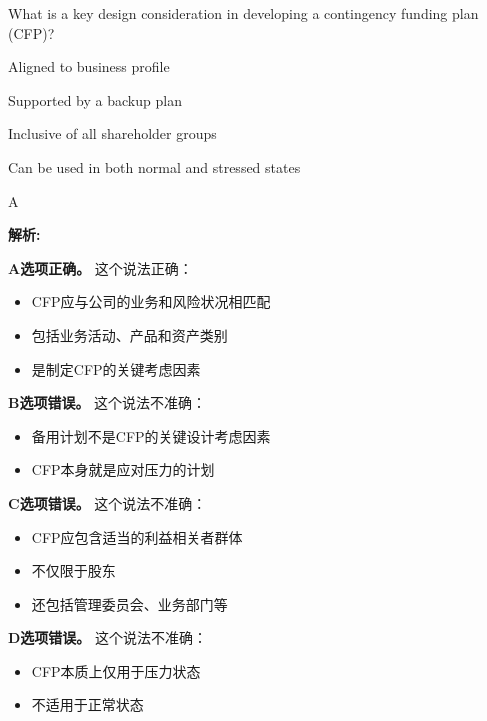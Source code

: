 \documentclass{article}
\newcounter{question} %
\newenvironment{explanation}
{\textbf{解析:}\par}
{\par}
\begin{document}
\begin{question}
    What is a key design consideration in developing a contingency funding plan (CFP)?
\end{question}

\begin{choices}
    \item Aligned to business profile
    \item Supported by a backup plan
    \item Inclusive of all shareholder groups
    \item Can be used in both normal and stressed states
\end{choices}

\begin{correctanswer}
    A
\end{correctanswer}

\begin{explanation}
    \textbf{A选项正确。}
    这个说法正确：
    \begin{itemize}
        \item CFP应与公司的业务和风险状况相匹配
        \item 包括业务活动、产品和资产类别
        \item 是制定CFP的关键考虑因素
    \end{itemize}

    \textbf{B选项错误。}
    这个说法不准确：
    \begin{itemize}
        \item 备用计划不是CFP的关键设计考虑因素
        \item CFP本身就是应对压力的计划
    \end{itemize}

    \textbf{C选项错误。}
    这个说法不准确：
    \begin{itemize}
        \item CFP应包含适当的利益相关者群体
        \item 不仅限于股东
        \item 还包括管理委员会、业务部门等
    \end{itemize}

    \textbf{D选项错误。}
    这个说法不准确：
    \begin{itemize}
        \item CFP本质上仅用于压力状态
        \item 不适用于正常状态
    \end{itemize}
\end{explanation}
\end{document}
